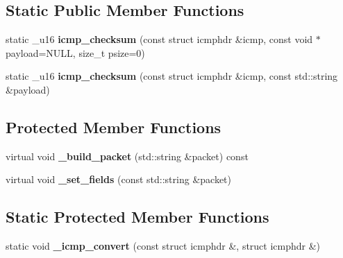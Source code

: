 \subsection*{Static Public Member Functions}
\begin{CompactItemize}
\item 
\hypertarget{classsocketpp_1_1ICMP__RawSocket_6c8a1364919485932221942c472ea95e}{
static \_\-u16 \textbf{icmp\_\-checksum} (const struct icmphdr \&icmp, const void $\ast$payload=NULL, size\_\-t psize=0)}
\label{classsocketpp_1_1ICMP__RawSocket_6c8a1364919485932221942c472ea95e}

\item 
\hypertarget{classsocketpp_1_1ICMP__RawSocket_eb8e83796aefe5a5dd7035490902a537}{
static \_\-u16 \textbf{icmp\_\-checksum} (const struct icmphdr \&icmp, const std::string \&payload)}
\label{classsocketpp_1_1ICMP__RawSocket_eb8e83796aefe5a5dd7035490902a537}

\end{CompactItemize}
\subsection*{Protected Member Functions}
\begin{CompactItemize}
\item 
\hypertarget{classsocketpp_1_1ICMP__RawSocket_1dcbe47b02ddfff9545cedca9d78e36c}{
virtual void \textbf{\_\-build\_\-packet} (std::string \&packet) const }
\label{classsocketpp_1_1ICMP__RawSocket_1dcbe47b02ddfff9545cedca9d78e36c}

\item 
\hypertarget{classsocketpp_1_1ICMP__RawSocket_e183b11c080f5d74dbc386ec53e7feb5}{
virtual void \textbf{\_\-set\_\-fields} (const std::string \&packet)}
\label{classsocketpp_1_1ICMP__RawSocket_e183b11c080f5d74dbc386ec53e7feb5}

\end{CompactItemize}
\subsection*{Static Protected Member Functions}
\begin{CompactItemize}
\item 
\hypertarget{classsocketpp_1_1ICMP__RawSocket_9ecff00c5732fced1d5dda68a5709651}{
static void \textbf{\_\-icmp\_\-convert} (const struct icmphdr \&, struct icmphdr \&)}
\label{classsocketpp_1_1ICMP__RawSocket_9ecff00c5732fced1d5dda68a5709651}

\end{CompactItemize}

